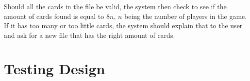 \documentclass[a4paper, 11pt] {article}
\begin{document}
Should all the cards in the file be valid, the system then check to see if the amount of cards found is equal to $8n$, $n$ being the number of players in the game. If it has too many or too little cards, the system should explain that to the user and ask for a new file that has the right amount of cards.
\pagebreak
	\section*{Testing Design}
\end{document}
